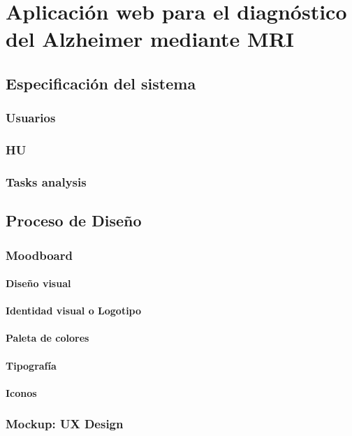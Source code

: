 \chapter{Aplicación web para el diagnóstico del Alzheimer mediante MRI}


\section{Especificación del sistema}
\subsection{Usuarios}
\subsection{HU}
\subsection{Tasks analysis}

\section{Proceso de Diseño}
\subsection{Moodboard}
\subsubsection{Diseño visual}
\subsubsection{Identidad visual o Logotipo}
\subsubsection{Paleta de colores}
\subsubsection{Tipografía}
\subsubsection{Iconos}

\subsection{Mockup: UX Design}
